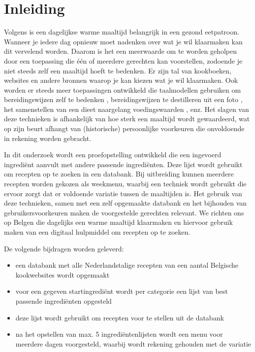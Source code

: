 \documentclass{hogent-article}
\begin{document}


\section{Inleiding}%
\label{sec:inleiding}


Volgens \textcite{Galle2016} is een dagelijkse warme maaltijd belangrijk in een gezond eetpatroon. Wanneer je iedere dag opnieuw moet nadenken over wat je wil klaarmaken kan dit vervelend worden. Daarom is het een meerwaarde om te worden geholpen door een toepassing die één of meerdere gerechten kan voorstellen, zodoende je niet steeds zelf een maaltijd hoeft te bedenken. Er zijn tal van kookboeken, websites en andere bronnen waarop je kan kiezen wat je wil klaarmaken. Ook worden er steeds meer toepassingen ontwikkeld die taalmodellen gebruiken om bereidingswijzen zelf te bedenken \autocite{Santos2020}, bereidingswijzen te destilleren uit een foto \autocite{Salvador2019}, het samenstellen van een dieet naargelang voedingswaarden \autocite{Aljbawi2020}, enz. Het slagen van deze technieken is afhankelijk van hoe sterk een maaltijd wordt gewaardeerd, wat op zijn beurt afhangt van (historische) persoonlijke voorkeuren die onvoldoende in rekening worden gebracht.

In dit onderzoek wordt een proefopstelling ontwikkeld die een ingevoerd ingrediënt aanvult met andere passende ingrediënten. Deze lijst wordt gebruikt om recepten op te zoeken in een databank. Bij uitbreiding kunnen meerdere recepten worden gekozen als weekmenu, waarbij een techniek wordt gebruikt die ervoor zorgt dat er voldoende variatie tussen de maaltijden is. Het gebruik van deze technieken, samen met een zelf opgemaakte databank en het bijhouden van gebruikersvoorkeuren maken de voorgestelde gerechten relevant. We richten ons op Belgen die dagelijks een warme maaltijd klaarmaken en hiervoor gebruik maken van een digitaal hulpmiddel om recepten op te zoeken. 

De volgende bijdragen worden geleverd:
\begin{itemize}
    \item een databank met alle Nederlandstalige recepten van een aantal Belgische kookwebsites wordt opgemaakt
    \item voor een gegeven startingrediënt wordt per categorie een lijst van best passende ingrediënten opgesteld
    \item deze lijst wordt gebruikt om recepten voor te stellen uit de databank
    \item na het opstellen van max. 5 ingrediëntenlijsten wordt een menu voor meerdere dagen voorgesteld, waarbij wordt rekening gehouden met de variatie
\end{itemize}
\end{document}
